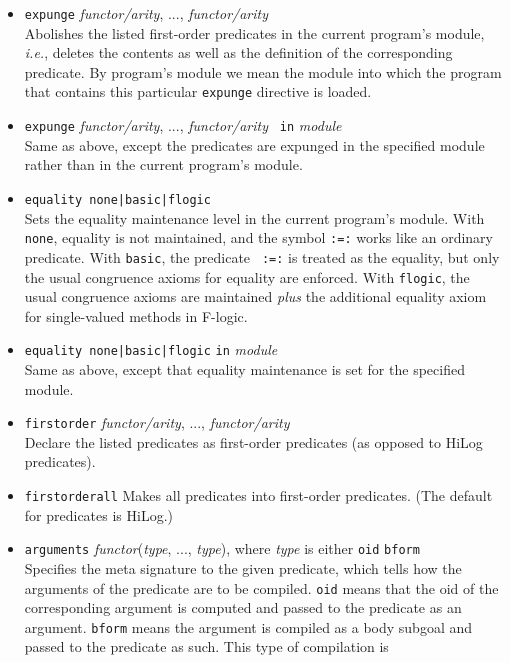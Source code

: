 \documentclass[11pt]{article}
\newcommand{\fl}{\mbox{F-logic}\xspace}
\begin{document}
\begin{itemize}
\item {\tt expunge} {\em functor/arity}, ..., {\em functor/arity}
  \\
  Abolishes the listed first-order predicates in the current program's module,
  {\it i.e.}, deletes the contents as well as the definition of the
  corresponding predicate. By program's module we mean the module into
  which the program that contains this particular {\tt expunge} directive
  is loaded.
\item {\tt expunge} {\em functor/arity}, ..., {\em functor/arity} {\tt
    in} \emph{module}\\
  Same as above, except the predicates are expunged in the specified
    module rather than in the current program's module.
  \item {\tt equality none|basic|flogic}
    \\
    Sets the equality maintenance level in the current program's module.
    With {\tt none}, equality is not maintained, and the symbol {\tt :=:}
    works like an ordinary predicate.  With {\tt basic}, the predicate {\tt
      :=:} is treated as the equality, but only the usual congruence axioms
    for equality are enforced. With {\tt flogic}, the usual congruence
    axioms are maintained \emph{plus} the additional equality axiom for
    single-valued methods in \fl.
\item {\tt equality none|basic|flogic} {\tt in}  \emph{module}
  \\
  Same as above, except that equality maintenance is set for the specified
  module.
\item {\tt firstorder} {\em functor/arity}, ..., {\em functor/arity}
  \\
  Declare the listed predicates as first-order predicates (as opposed to HiLog
  predicates).
\item {\tt firstorderall}
  Makes all predicates into first-order predicates. (The default for predicates
  is HiLog.)
\item {\tt arguments} \emph{functor}(\emph{type}, ..., \emph{type}), where
  \emph{type} is either {\tt oid} {\tt bform}
  \\
  Specifies the meta signature to the given predicate, which tells how the
  arguments of the predicate are to be compiled. {\tt oid} means that the
  oid of the corresponding argument is computed and passed to the predicate
  as an argument. {\tt bform} means the argument is compiled as a body
  subgoal and passed to the predicate as such. This type of compilation is

\end{itemize}
\end{document}
